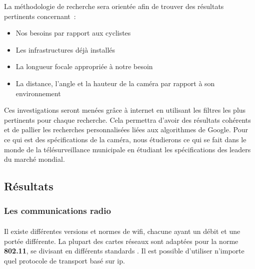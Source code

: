 La méthodologie de recherche sera orientée afin de trouver des résultats pertinents concernant :
\begin{itemize}
    \item Nos besoins par rapport aux cyclistes
    \item Les infrastructures déjà installés
    \item La longueur focale appropriée à notre besoin
    \item La distance, l'angle et la hauteur de la caméra par rapport à son environnement
\end{itemize}
Ces investigations seront menées grâce à internet en utilisant les filtres les plus pertinents pour chaque recherche.
Cela permettra d'avoir des résultats cohérents et de pallier les recherches personnalisées liées aux algorithmes de Google.
Pour ce qui est des spécifications de la caméra, nous étudierons ce qui se fait dans
le monde de la télésurveillance municipale en étudiant les spécifications des leaders du marché mondial.

\subsection{Résultats}
\label{sec:comparaisonProtocoleCommnunicationResultats}

\subsubsection{Les communications radio}
\label{sec:communicationRadio}

\paragraph{}
\label{sec:wifi}

Il existe différentes versions et normes de \gls{wifi}, chacune ayant un débit et une portée différente.
La plupart des cartes réseaux sont adaptées pour la norme \textbf{802.11}, se divisant en différents standards
\cite{wifi}. Il est possible d’utiliser n’importe quel protocole de transport basé sur \gls{ip}.\newline

